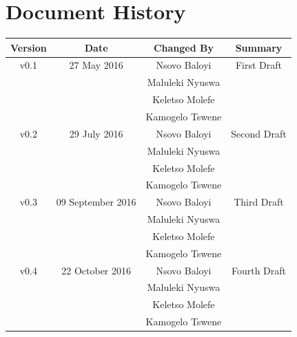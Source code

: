 \documentclass[a4paper,12pt]{article}
\begin{document}
	\newpage
	
	\tableofcontents
	\newpage
	\section*{Document History}
	
	\begin{table}[h!]
		
		\centering %
		\begin{tabular}{c c c c} %
			\hline\hline %
			Version & Date & Changed By & Summary \\ [0.5ex] %
			\hline %
			v0.1 & 27 May 2016 & Nsovo Baloyi & First Draft 
			\\ & & Maluleki Nyuswa &  
			\\ & & Keletso Molefe &
			\\ & & Kamogelo Tswene & \\ [1ex] 
			\hline
			v0.2 & 29 July 2016 & Nsovo Baloyi & Second Draft 
			\\ & & Maluleki Nyuswa &  
			\\ & & Keletso Molefe &
			\\ & & Kamogelo Tswene & \\ [1ex] 
			\hline
			v0.3 & 09 September 2016 & Nsovo Baloyi & Third Draft 
			\\ & & Maluleki Nyuswa &  
			\\ & & Keletso Molefe &
			\\ & & Kamogelo Tswene & \\ [1ex] 
			\hline
			v0.4 & 22 October 2016 & Nsovo Baloyi & Fourth  Draft 
			\\ & & Maluleki Nyuswa &  
			\\ & & Keletso Molefe &
			\\ & & Kamogelo Tswene & \\ [1ex] 
			\hline \hline
		\end{tabular}
		\label{table:nonlin} %
	\end{table}

	\newpage
	
\end{document}
